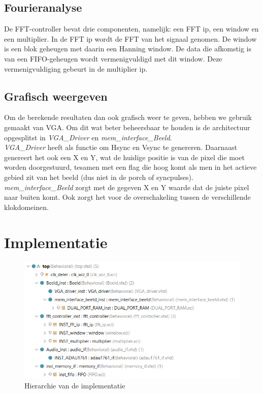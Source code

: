 \documentclass[a4paper,kul]{kulakarticle} %
\begin{document}
\subsection{Fourieranalyse}

De FFT-controller bevat drie componenten, namelijk: een FFT ip, een window en een multiplier. In de FFT ip wordt de FFT van het signaal genomen. De window is een blok geheugen met daarin een Hanning window. De data die afkomstig is van een FIFO-geheugen wordt vermenigvuldigd met dit window. Deze vermenigvuldiging gebeurt in de multiplier ip.

\subsection{Grafisch weergeven}
Om de berekende resultaten dan ook grafisch weer te geven, hebben we gebruik gemaakt van VGA. Om dit wat beter beheersbaar te houden is de architectuur opgesplitst in \textit{VGA\_Driver} en \textit{mem\_interface\_Beeld}.\\
\textit{VGA\_Driver} heeft als functie om Hsync en Vsync te genereren. Daarnaast genereert het ook een X en Y, wat de huidige positie is van de pixel die moet worden doorgestuurd, tesamen met een flag die hoog komt als men in het actieve gebied zit van het beeld (dus niet in de porch of syncpulses).\\
\textit{mem\_interface\_Beeld} zorgt met de gegeven X en Y waarde dat de juiste pixel naar buiten komt. Ook zorgt het voor de overschakeling tussen de verschillende klokdomeinen.

\section{Implementatie}

\begin{figure}[H]
	\centering
	\includegraphics[width=0.7\linewidth]{HierarchieVivado.png}
	\caption{Hierarchie van de implementatie}
	\label{fig:hierarchieVivado}
\end{figure}
\end{document}
